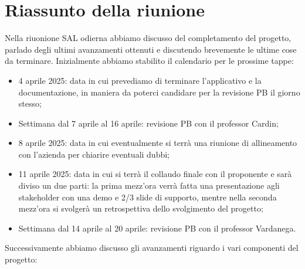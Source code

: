 \section{Riassunto della riunione}
Nella riuonione SAL odierna abbiamo discusso del completamento del progetto, parlado degli ultimi avanzamenti ottenuti e discutendo brevemente le ultime cose da terminare.
Inizialmente abbiamo stabilito il calendario per le prossime tappe:
\begin{itemize}
    \item 4 aprile 2025: data in cui prevediamo di terminare l'applicativo e la documentazione, in maniera da poterci candidare per la revisione PB il giorno stesso;
    \item Settimana dal 7 aprile al 16 aprile: revisione PB con il professor Cardin;
    \item 8 aprile 2025: data in cui eventualmente si terrà una riunione di allineamento con l'azienda per chiarire eventuali dubbi;
    \item 11 aprile 2025: data in cui si terrà il collaudo finale con il proponente e sarà diviso un due parti: la prima mezz'ora verrà fatta una presentazione agli stakeholder con una demo e 2/3 slide di supporto, mentre nella seconda mezz'ora si svolgerà un retrospettiva dello svolgimento del progetto;
    \item Settimana dal 14 aprile al 20 aprile: revisione PB con il professor Vardanega.
\end{itemize}
Successivamente abbiamo discusso gli avanzamenti riguardo i vari componenti del progetto:
